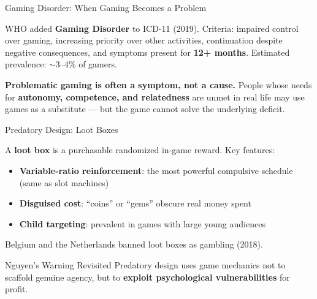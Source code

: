 \documentclass[aspectratio=169,11pt]{beamer}
\begin{document}
\begin{frame}[t]{Gaming Disorder: When Gaming Becomes a Problem}
\begin{conceptbox}
\footnotesize
WHO added \textbf{Gaming Disorder} to ICD-11 (2019). Criteria: impaired control over gaming, increasing priority over other activities, continuation despite negative consequences, and symptoms present for \textbf{12+ months}. Estimated prevalence: $\sim$3--4\% of gamers.
\end{conceptbox}

\vspace{0.15cm}
\begin{conceptbox}
\footnotesize
\textbf{Problematic gaming is often a symptom, not a cause.} People whose needs for \textbf{autonomy, competence, and relatedness} are unmet in real life may use games as a substitute --- but the game cannot solve the underlying deficit.
\end{conceptbox}
\end{frame}

\begin{frame}[t]{Predatory Design: Loot Boxes}
\begin{casestudybox}
\footnotesize
A \textbf{loot box} is a purchasable randomized in-game reward. Key features:
\begin{itemize}
    \item \textbf{Variable-ratio reinforcement}: the most powerful compulsive schedule (same as slot machines)
    \item \textbf{Disguised cost}: ``coins'' or ``gems'' obscure real money spent
    \item \textbf{Child targeting}: prevalent in games with large young audiences
\end{itemize}
Belgium and the Netherlands banned loot boxes as gambling (2018).
\end{casestudybox}

\vspace{0.1cm}
\begin{alertblock}{Nguyen's Warning Revisited}
\footnotesize
Predatory design uses game mechanics not to scaffold genuine agency, but to \textbf{exploit psychological vulnerabilities} for profit.
\end{alertblock}
\end{frame}
\end{document}
